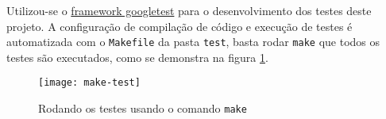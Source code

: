 Utilizou-se o \href{https://github.com/google/googletest}{framework googletest} para o desenvolvimento dos testes deste projeto.
A configuração de compilação de código e execução de testes é automatizada com o \texttt{Makefile} da pasta \texttt{test}, basta rodar \texttt{make} que todos os testes são executados, como se demonstra na figura \ref{maketest}.

\begin{figure}[h]
    \centering
    \texttt{[image: make-test]}
    \caption{Rodando os testes usando o comando \texttt{make}}
    \label{maketest}
\end{figure}

